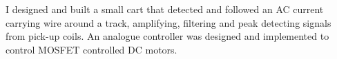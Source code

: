 \descript{ }
\vspace*{-\topsep}  %
\begin{justify}
I designed and built a small cart that detected and followed an AC current carrying wire around a track, amplifying, filtering and peak detecting signals from pick-up coils. An analogue controller was designed and implemented to control MOSFET controlled DC motors.
\end{justify}
\sectionsep